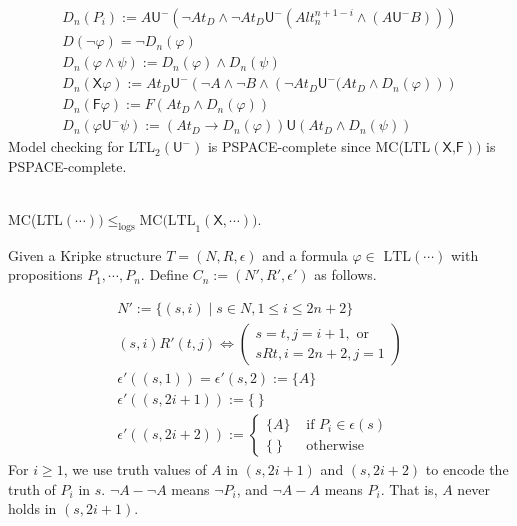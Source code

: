 \documentclass[12pt]{article}
\begin{document}
$$\begin{array}{l}
D_n(P_i):=A\textsf{U}^-\left(\neg At_D\wedge \neg At_D\textsf{U}^-\left(Alt^{n+1-i}_n\wedge (A\textsf{U}^-B)\right)\right)\\
D(\neg \varphi)=\neg D_n(\varphi)\\
D_n(\varphi\wedge\psi):=D_n(\varphi)\wedge D_n(\psi)\\
D_n(\textsf{X}\varphi):=At_D\textsf{U}^-\left(\neg A\wedge\neg B\wedge\left(
\neg At_D\textsf{U}^-(At_D\wedge D_n(\varphi)\right)\right)\\
D_n(\textsf{F}\varphi):=F(At_D\wedge D_n(\varphi))\\
D_n(\varphi\textsf{U}^-\psi):=(At_D\rightarrow D_n(\varphi))\textsf{U}(At_D\wedge D_n(\psi))
\end{array}$$
%
\color{red} Model checking for LTL$_2(\textsf{U}^-)$ is PSPACE-complete since MC(LTL$(\textsf{X,F}))$ is PSPACE-complete. 
\color{black}

\ \\

MC(LTL$(\cdots))\leq_{\text{logs}} \mbox{MC(LTL}_1(\textsf{X},\cdots))$. 


Given a Kripke structure $T=(N,R,\epsilon)$ and a formula $\varphi\in \mbox{ LTL}(\cdots)$ with propositions $P_1,\cdots, P_n$. Define $C_n:=(N',R',\epsilon')$ as follows.

$$\begin{array}{l}
N':=\{(s,i)\mid s\in N, 1\leq i\leq 2n+2\}\\

(s,i)R'(t,j) \Longleftrightarrow \left(\begin{array}{l} s=t, j=i+1, \mbox{ or}\\
                                 sRt, i=2n+2, j=1 
\end{array}\right)\\

\epsilon'((s,1))=\epsilon'(s,2):=\{A\}\\

\epsilon'((s,2i+1)):=\{ \ \}\\

\epsilon'((s,2i+2)):=\left\{\begin{array}{ll}
\{A\} & \mbox{ if }P_i\in \epsilon(s)\\
\{\ \} & \mbox{ otherwise }  
\end{array}\right.
\end{array}
$$
%
For $i\geq 1$, we use truth values of $A$ in $(s,2i+1)$ and $(s,2i+2)$ to encode the truth of $P_i$ in $s$. $\neg A-\neg A$ means $\neg P_i$, and $\neg A-A$ means $P_i$. That is, $A$ never holds in $(s,2i+1)$. 
\end{document}
